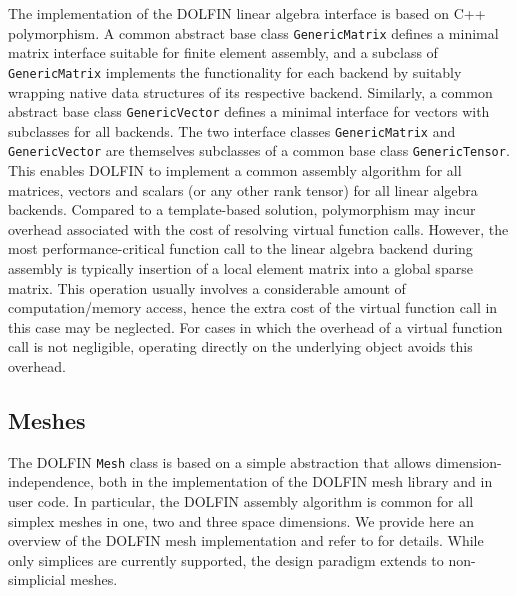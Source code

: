 \documentclass[acmtoms]{acmtrans2m}
\newcommand{\emp}[1]{\texttt{#1}}
\newcommand{\dolfin}{DOLFIN}
\begin{document}
The implementation of the \dolfin{} linear algebra interface is based
on C++ polymorphism. A common abstract base class
\emp{Generic\-Matrix} defines a minimal matrix interface suitable for
finite element assembly, and a subclass of \emp{Generic\-Matrix}
implements the functionality for each backend by suitably wrapping
native data structures of its respective backend. Similarly, a common
abstract base class \emp{GenericVector} defines a minimal interface
for vectors with subclasses for all backends. The two interface
classes \emp{GenericMatrix} and \emp{GenericVector} are themselves
subclasses of a common base class \emp{GenericTensor}. This enables
\dolfin{} to implement a common assembly algorithm for all matrices,
vectors and scalars (or any other rank tensor) for all linear algebra
backends.
Compared to a template-based solution, polymorphism may incur overhead
associated with the cost of resolving virtual function calls. However,
the most performance-critical function call to the linear algebra
backend during assembly is typically insertion of a local element
matrix into a global sparse matrix. This operation usually involves
a considerable amount of
computation/memory access, hence the extra cost of the virtual function
call in this case may be neglected. For cases in which the
overhead of a virtual function call is not negligible, operating directly on
the underlying object avoids this overhead.
\subsection{Meshes}

The \dolfin{} \emp{Mesh} class is based on a simple abstraction that
allows dimension-independence, both in the implementation of the
\dolfin{} mesh library and in user code. In particular, the \dolfin{}
assembly algorithm is common for all simplex meshes in one, two and
three space dimensions. We provide here an overview of the \dolfin{}
mesh implementation and refer to  for details.
While only simplices are currently supported, the design
paradigm extends to non-simplicial meshes.
\end{document}
